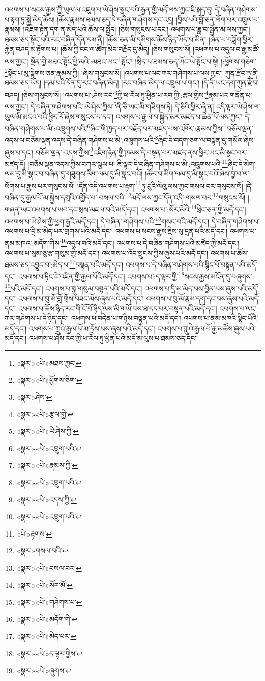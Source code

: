 འཕགས་པ་སངས་རྒྱས་ཀྱི་ཡུལ་ལ་འཇུག་པ་ཡེ་ཤེས་སྣང་བའི་རྒྱན་གྱི་མདོ་ལས་ཀྱང་ཇི་སྐད་དུ། དེ་བཞིན་གཤེགས་པ་རྟག་ཏུ་སྐྱེ་མེད་ཆོས། །ཆོས་རྣམས་ཐམས་ཅད་དེ་བཞིན་གཤེགས་དང་འདྲ། །བྱིས་པའི་བློ་ཅན་ལོག་པར་འཁྲུལ་པ་རྣམས། །འཇིག་རྟེན་དག་ན་མེད་པའི་ཆོས་ལ་སྤྱོད། །ཅེས་གསུངས་པ་དང་། འཕགས་པ་ཟླ་བ་སྒྲོན་མ་ལས་ཀྱང་། ཐམས་ཅད་སྟོང་པའི་རང་བཞིན་དོན་དམ་ནི། །ཆོས་ཅན་མི་དམིགས་ཆོས་ཉིད་ཡོད་པ་མིན། །ཞེན་པ་བཟློག་ཕྱིར་རྐྱེན་བཤད་མ་རྟོགས་པ། །ཆོས་ཀྱི་ངང་ལ་ཚིག་མེད་བརྗོད་དུ་མེད། །ཅེས་གསུངས་སོ། །འཕགས་པ་འདུལ་བ་རྒྱ་མཚོ་ལས་ཀྱང་། སྔོན་གྱི་མཐའ་སྟོང་ཕྱི་མའི་:མཐའ་ཡང་\footnote{«སྣར་»«པེ་»མཐས་ཀྱང་}སྟོང་། །སྲིད་པ་ཐམས་ཅད་ཡོང་ཡེ་སྟོང་པ་སྟེ། །:ཕྱོགས་གཅིག་\footnote{«སྣར་»«པེ་»ཕྱོགས་ཅིག་}སྟོང་པ་མུ་སྟེགས་ཅན་རྣམས་ཀྱི། །ཞེས་གསུངས་སོ། །འཕགས་པ་ལང་ཀར་གཤེགས་པ་ལས་ཀྱང་། ཀུན་རྫོབ་ཏུ་ནི་ཐམས་ཅད་ཡོད། །དམ་པའི་དོན་དུ་རང་བཞིན་མེད། །རང་བཞིན་མེད་ལ་འཁྲུལ་པ་གང་། །དེ་ནི་ཡང་དག་ཀུན་རྫོབ་བཤད། །ཅེས་གསུངས་སོ། །འཕགས་པ་:ཤེས་རབ་\footnote{«སྣར་»ཤེས་}ཀྱི་ཕ་རོལ་ཏུ་ཕྱིན་པ་རབ་ཀྱི་:རྩལ་གྱིས་\footnote{«སྣར་»«པེ་»རྩལ་གྱི་}རྣམ་པར་གནོན་པ་ལས་ཀྱང་། དེ་བཞིན་གཤེགས་པའི་:ཡེ་ཤེས་ཀྱིས་\footnote{«སྣར་»«པེ་»ཡེ་ཤེས་ཀྱི་}ནི་ཅི་ཡང་མི་གཟིགས་ཏེ། དེ་ཅིའི་ཕྱིར་ཞེ་ན། འདི་ལྟར་ཡེ་ཤེས་ལ་ཡུལ་མི་མངའ་བའི་ཕྱིར་རོ་ཞེས་གསུངས་པ་དང་། འཕགས་པ་རྒྱལ་བ་སྐྱེད་མར་མཛད་པ་ཆེན་པོ་ལས་ཀྱང་། དེ་བཞིན་གཤེགས་པ་མི་:འཁྲུགས་པའི་\footnote{«སྣར་»«པེ་»འཁྲུག་པའི་}ཞིང་གི་ཁྱད་པར་བརྗོད་པར་མཛད་པས་འཁོར་:རྣམས་ཀྱིས་\footnote{«སྣར་»«པེ་»རྣམས་ཀྱི་}བཅོམ་ལྡན་འདས་ལ་བཅོམ་ལྡན་འདས་དེ་བཞིན་གཤེགས་པ་མི་:འཁྲུགས་པའི་\footnote{«སྣར་»«པེ་»འཁྲུག་པའི་}ཞིང་དེ་བདག་ཅག་ལ་བསྟན་དུ་གསོལ་ཞེས་ཞུས་པ་དང་། བཅོམ་ལྡན་:འདས་ཀྱིས་\footnote{«སྣར་»«པེ་»འདས་ཀྱི་}འཇིག་རྟེན་གྱི་ཁམས་དེ་བསྟན་པར་མཛད་ནས་ཕྱིར་ཡང་མི་སྣང་བར་མཛད་དོ། །བཅོམ་ལྡན་འདས་ཀྱིས་བཀའ་སྩལ་པ། ཇི་ལྟར་དེ་བཞིན་གཤེགས་པ་མི་:འཁྲུགས་པའི་\footnote{«སྣར་»«པེ་»འཁྲུག་པའི་}ཞིང་དེ་མིག་ལམ་དུ་མི་སྣང་བ་བཞིན་དུ་གཟུགས་མིག་ལམ་དུ་མི་སྣང་བའོ། །ཚོར་བ་མིག་ལམ་དུ་མི་སྣང་བའོ་ཞེས་བྱ་བ་ལ་སོགས་པ་རྒྱས་པར་གསུངས་སོ། །དོན་འདི་འཕགས་པ་རྟག་\footnote{«པེ་»རྟགས་}ཏུ་ངུའི་ལེའུ་ལས་ཀྱང་གསལ་བར་གསུངས་སོ། །དེ་བཞིན་དུ་རྒྱལ་པོ་མ་སྐྱེས་དགྲའི་འགྱོད་པ་:བསལ་བའི་\footnote{«སྣར་»གསལ་བའི་}མདོ་ལས་ཀྱང་དོན་འདི་:གསལ་བར་\footnote{«སྣར་»«པེ་»བསལ་བར་}གསུངས་སོ། །གཞན་ཡང་འཕགས་པ་ཡབ་དང་སྲས་མཇལ་བའི་མདོ་དང་། འཕགས་པ་:སོར་མོའི་\footnote{«སྣར་»«པེ་»སོར་མོ་}ཕྲེང་ཅན་གྱི་མདོ་དང་། འཕགས་པ་ཡེ་ཤེས་ཀྱི་ཕྱག་རྒྱའི་མདོ་དང་། དེ་བཞིན་:གཤེགས་པའི་\footnote{«སྣར་»«པེ་»གཤེགས་པ་}གསང་བའི་མདོ་དང་། དེ་བཞིན་གཤེགས་པ་འཕགས་པ་དྲི་མ་མེད་པར་གྲགས་པའི་མདོ་དང་། འཕགས་པ་སངས་རྒྱས་རྗེས་སུ་དྲན་པའི་མདོ་དང་། འཕགས་པ་ནམ་མཁའ་:མདོག་གིས་\footnote{«སྣར་»«པེ་»མདོག་གི་}འདུལ་བའི་མདོ་དང་། འཕགས་པ་དེ་བཞིན་གཤེགས་པའི་མཛོད་ཀྱི་མདོ་དང་། འཕགས་པ་སུམ་ཅུ་རྩ་གསུམ་གྱི་མདོ་དང་། འཕགས་པ་འོད་སྲུངས་ཀྱིས་ཞུས་པའི་མདོ་དང་། འཕགས་པ་ཆོས་ཐམས་ཅད་འབྱུང་བ་:མེད་པ་\footnote{«སྣར་»«པེ་»མེད་པར་}བསྟན་པའི་མདོ་དང་། འཕགས་པ་དེ་བཞིན་གཤེགས་པའི་སྙིང་པོ་བསྟན་པའི་མདོ་དང་། འཕགས་པ་ཏིང་ངེ་འཛིན་གྱི་རྒྱལ་པོའི་མདོ་དང་། འཕགས་པ་:ད་ལྟར་གྱི་\footnote{«སྣར་»«པེ་»ད་ལྟར་གྱིས་}སངས་རྒྱས་མངོན་དུ་བཞུགས་\footnote{«སྣར་»«པེ་»ཞུགས་}པའི་མདོ་དང་། འཕགས་པ་སྐུ་གསུམ་བསྟན་པའི་མདོ་དང་། འཕགས་པ་དྲི་མ་མེད་པས་བྱིན་པས་ཞུས་པའི་མདོ་དང་། འཕགས་པ་བུ་མོ་བློ་གྲོས་བཟང་མོས་ཞུས་པའི་མདོ་དང་། འཕགས་པ་བུ་མོ་རྣམ་དག་དང་བས་ཞུས་པའི་མདོ་དང་། འཕགས་པ་ཆོས་ཉིད་རང་གི་ངོ་བོ་ཉིད་ལས་མི་གཡོ་བས་ཐ་དད་པར་བསྟན་པའི་མདོ་དང་། འཕགས་པ་ལང་ཀར་གཤེགས་པ་དེ་ཉིད་དང་། འཕགས་པ་བདེན་པ་གཉིས་བསྟན་པའི་མདོ་དང་། འཕགས་པ་ནམ་མཁའི་སྙིང་པོའི་མདོ་དང་། འཕགས་པ་ཀླུའི་རྒྱལ་པོ་མ་དྲོས་པས་ཞུས་པའི་མདོ་དང་། འཕགས་པ་ཀླུའི་རྒྱལ་པོ་རྒྱ་མཚོས་ཞུས་པའི་མདོ་དང་། འཕགས་པ་ཤེས་རབ་ཀྱི་ཕ་རོལ་ཏུ་ཕྱིན་པའི་མདོ་མ་ལུས་པ་ཐམས་ཅད་དང་། 